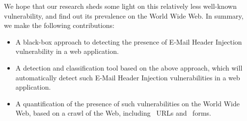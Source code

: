 We hope that our research sheds some light on this relatively less well-known vulnerability, and find out its prevalence on the World Wide Web. In summary, we make the following contributions:
\begin{itemize}

	\item{A black-box approach to detecting the presence of E-Mail Header Injection vulnerability in a web application.}

	\item{A detection and classification tool based on the above approach, which will automatically detect such E-Mail Header Injection vulnerabilities in a web application.}

	\item{A quantification of the presence of such vulnerabilities on the World Wide Web, based on a crawl of the Web, including \urls\ URLs and \forms\ forms.}

\end{itemize}